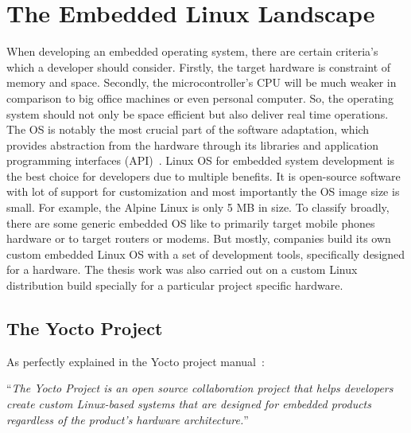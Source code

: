 \section{The Embedded Linux Landscape}\label{section:embeddedlinux}

When developing an embedded operating system, there are certain criteria’s which a developer should consider.  Firstly, the target hardware is constraint of memory and space. Secondly, the microcontroller’s CPU will be much weaker in comparison to big office machines or even personal computer. So, the operating system should not only be space efficient but also deliver real time operations. The OS is notably the most crucial part of the software adaptation, which  provides abstraction from the hardware through its libraries and application programming interfaces (API)~\parencite{Reference1}. Linux OS for embedded system development is the best choice for developers due to multiple benefits. It is open-source software with lot of support for customization and most importantly the OS image size is small. For example, the Alpine Linux is only 5 MB in size. To classify broadly, there are some generic embedded OS like  to primarily target mobile phones hardware or  to target routers or modems. But mostly, companies build its own custom embedded Linux OS with a set of development tools, specifically designed for a hardware. The thesis work was also carried out on a custom Linux distribution build specially for a particular project specific hardware.

\subsection{The Yocto Project}

As perfectly explained in the Yocto project manual~\parencite{Reference2}:
\vspace{0.5cm}


\enquote{\emph{The Yocto Project is an open source collaboration project that helps developers create custom Linux-based systems that are designed for embedded products regardless of the product’s hardware architecture.}}
\vspace{0.5cm}

